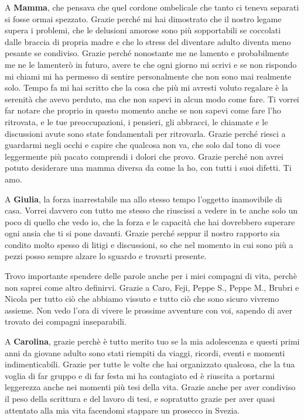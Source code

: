 \documentclass[cucitura%
,12pt%
]{toptesi}
\begin{document}
A \textbf{Mamma}, che pensava che quel cordone ombelicale che tanto ci teneva separati si fosse ormai spezzato. Grazie perché mi hai dimostrato che il nostro legame supera i problemi, che le delusioni amorose sono più sopportabili se coccolati dalle braccia di propria madre e che lo stress del diventare adulto diventa meno pesante se condiviso. Grazie perché nonostante me ne lamento e probabilmente me ne le lamenterò in futuro, avere te che ogni giorno mi scrivi e se non rispondo mi chiami mi ha permesso di sentire personalmente che non sono mai realmente solo. Tempo fa mi hai scritto che la cosa che più mi avresti voluto regalare è la serenità che avevo perduto, ma che non sapevi in alcun modo come fare. Ti vorrei far notare che proprio in questo momento anche se non sapevi come fare l’ho ritrovata, e le tue preoccupazioni, i pensieri, gli abbracci, le chiamate e le discussioni avute sono state fondamentali per ritrovarla. Grazie perché riesci a guardarmi negli occhi e capire che qualcosa non va, che solo dal tono di voce leggermente più pacato comprendi i dolori che provo. Grazie perché non avrei potuto desiderare una mamma diversa da come la ho, con tutti i suoi difetti. Ti amo.

A \textbf{Giulia}, la forza inarrestabile ma allo stesso tempo l’oggetto inamovibile di casa. Vorrei davvero con tutto me stesso che riuscissi a vedere in te anche solo un poco di quello che vedo io, che la forza e le capacità che hai dovrebbero superare ogni ansia che ti si pone davanti. Grazie perché seppur il nostro rapporto sia condito molto spesso di litigi e discussioni, so che nel momento in cui sono più a pezzi posso sempre alzare lo sguardo e trovarti presente.

Trovo importante spendere delle parole anche per i miei compagni di vita, perchè non saprei come altro definirvi. Grazie a Caro, Feji, Peppe S., Peppe M., Brubri e Nicola per tutto ciò che abbiamo vissuto e tutto ciò che sono sicuro vivremo assieme. Non vedo l'ora di vivere le prossime avventure con voi, sapendo di aver trovato dei compagni inseparabili.

A \textbf{Carolina}, grazie perchè è tutto merito tuo se la mia adolescenza e questi primi anni da giovane adulto sono stati riempiti da viaggi, ricordi, eventi e momenti indimenticabili. Grazie per tutte le volte
che hai organizzato qualcosa, che la tua voglia di far gruppo e di far festa mi ha contagiato ed è riuscita a portarmi leggerezza anche nei momenti più tesi della vita. Grazie anche per aver condiviso il peso 
della scrittura e del lavoro di tesi, e sopratutto grazie per aver quasi attentato alla mia vita facendomi stappare un prosecco in Svezia.
\end{document}
